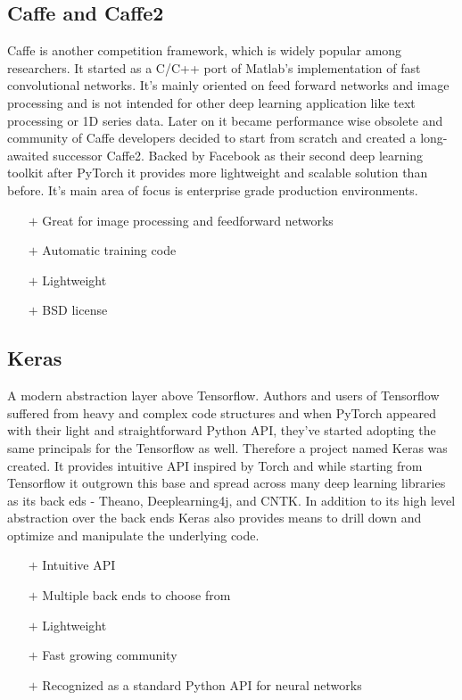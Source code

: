 \subsection{Caffe and Caffe2}

Caffe is another competition framework, which is widely popular among researchers. It started as a C/C++ port of Matlab's implementation of fast convolutional networks. It's mainly oriented on feed forward networks and image processing and is not intended for other deep learning application like text processing or 1D series data. Later on it became performance wise obsolete and community of Caffe developers decided to start from scratch and created a long-awaited successor Caffe2. Backed by Facebook as their second deep learning toolkit after PyTorch it provides more lightweight and scalable solution than before. It's main area of focus is enterprise grade production environments.

\begin{itemize}
    \item[$\boldsymbol{+}$] Great for image processing and feedforward networks
    \item[$\boldsymbol{+}$] Automatic training code
    \item[$\boldsymbol{+}$] Lightweight
    \item[$\boldsymbol{+}$] BSD license
\end{itemize}

\subsection{Keras}

A modern abstraction layer above Tensorflow. Authors and users of Tensorflow suffered from heavy and complex code structures and when PyTorch appeared with their light and straightforward Python API, they've started adopting the same principals for the Tensorflow as well. Therefore a project named Keras was created. It provides intuitive API inspired by Torch and while starting from Tensorflow it outgrown this base and spread across many deep learning libraries as its back eds - Theano, Deeplearning4j, and CNTK. In addition to its high level abstraction over the back ends Keras also provides means to drill down and optimize and manipulate the underlying code.

\begin{itemize}
    \item[$\boldsymbol{+}$] Intuitive API
    \item[$\boldsymbol{+}$] Multiple back ends to choose from
    \item[$\boldsymbol{+}$] Lightweight
    \item[$\boldsymbol{+}$] Fast growing community
    \item[$\boldsymbol{+}$] Recognized as a standard Python API for neural networks
\end{itemize}

